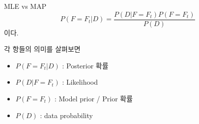 \documentclass{beamer}
\begin{document}
\begin{frame}[allowframebreaks]{MLE vs MAP}
\begin{equation} 
P(F = F_t | D) = \frac{P(D|F=F_t)P(F=F_t)}{P(D)}
\end{equation}
이다. 

\framebreak
 각 항들의 의미를 살펴보면 

\begin{itemize} 
\item $P(F = F_t | D)$ : Posterior 확률
\item $P( D | F = F_t )$ : Likelihood 
\item $P(F = F_t )$ : Model prior / Prior 확률
\item $P(D)$ : data probability 
\end{itemize} 



\end{frame}















\end{document}
